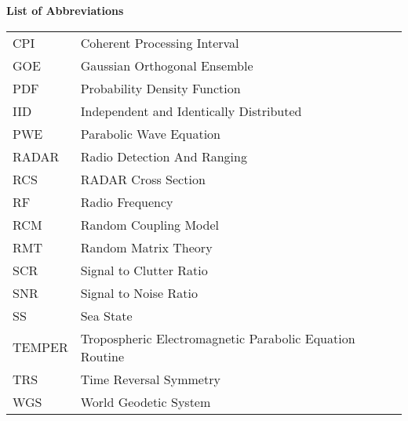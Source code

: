 \noindent\Large{\bf{List of Abbreviations}}

\vspace{24pt}

\small\normalsize

\begin{supertabular}{ll}
CPI & Coherent Processing Interval \\
GOE & Gaussian Orthogonal Ensemble \\
PDF & Probability Density Function \\
IID & Independent and Identically Distributed \\
PWE & Parabolic Wave Equation \\
RADAR & Radio Detection And Ranging\\
RCS & RADAR Cross Section \\
RF & Radio Frequency \\
RCM & Random Coupling Model \\
RMT & Random Matrix Theory \\
SCR & Signal to Clutter Ratio \\
SNR & Signal to Noise Ratio\\
SS & Sea State \\
TEMPER & Tropospheric Electromagnetic Parabolic Equation Routine \\
TRS & Time Reversal Symmetry \\
WGS & World Geodetic System \\
\end{supertabular}
